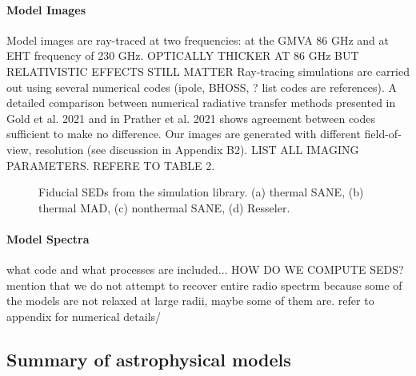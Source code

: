 \paragraph{Model Images}
Model images are ray-traced at two frequencies: at the GMVA 86 GHz and at EHT frequency of 230 GHz. 
OPTICALLY THICKER AT 86 GHz BUT RELATIVISTIC EFFECTS STILL MATTER
Ray-tracing simulations are carried out using several numerical codes (ipole, BHOSS, ? list codes are references). A detailed comparison between numerical radiative transfer methods presented in Gold et al. 2021 and in Prather et al. 2021 shows agreement between codes sufficient to make no difference. Our images are generated with different field-of-view, resolution (see discussion in Appendix B2).
LIST ALL IMAGING PARAMETERS. REFERE TO TABLE 2.

\begin{figure*}
  \caption{Fiducial SEDs from the simulation library.
    (a) thermal SANE, (b) thermal MAD, (c) nonthermal SANE, (d)
    Resseler.
    }
  \label{fig:fiducial_SEDs}
\end{figure*}

\paragraph{Model Spectra}
what code and what processes are included...
HOW DO WE COMPUTE SEDS? mention that we do not attempt to recover entire radio spectrm because some of the models are not relaxed at large radii, maybe some of them are. refer to appendix for numerical details/


\subsection{Summary of astrophysical models}

